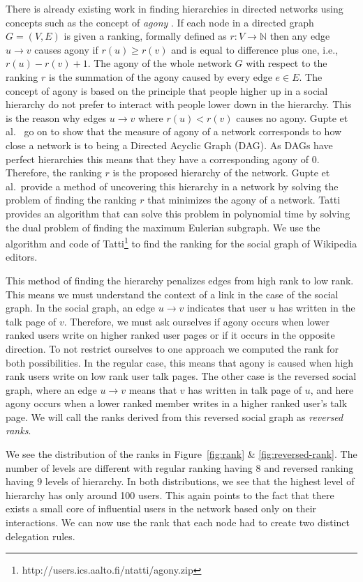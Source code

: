 There is already existing work in finding hierarchies in directed networks using concepts such as the concept of \textit{agony} \cite{Tatti2016,gupte2011finding}. If each node in a directed graph $G = (V,E)$ is given a ranking, formally defined as $r:V\rightarrow \mathbb{N}$ then any edge $u\rightarrow v$ causes agony if $r(u)\geq r(v)$ and is equal to difference plus one, i.e., $r(u)-r(v)+1$. The agony of the whole network $G$ with respect to the ranking $r$ is the summation of the agony caused by every edge $e \in E$. The concept of agony is based on the principle that people higher up in a social hierarchy do not prefer to interact with people lower down in the hierarchy. This is the reason why edges $u\rightarrow v$ where $r(u)<r(v)$ causes no agony. Gupte et al.\ \cite{gupte2011finding} go on to show that the measure of agony of a network corresponds to how close a network is to being a Directed Acyclic Graph (DAG). As DAGs have perfect hierarchies this means that they have a corresponding agony of $0$. Therefore, the ranking $r$ is the proposed hierarchy of the network. Gupte et al.\ provide a method of uncovering this hierarchy in a network by solving the problem of finding the ranking $r$ that minimizes the agony of a network. Tatti \cite{Tatti2016} provides an algorithm that can solve this problem in polynomial time by solving the dual problem of finding the maximum Eulerian subgraph. We use the algorithm and code of Tatti\footnote{http://users.ics.aalto.fi/ntatti/agony.zip} to find the ranking for the social graph of Wikipedia editors. 

This method of finding the hierarchy penalizes edges from high rank to low rank. This means we must understand the context of a link in the case of the social graph. In the social graph, an edge $u \rightarrow v$ indicates that user $u$ has written in the talk page of $v$. Therefore, we must ask ourselves if agony occurs when lower ranked users write on higher ranked user pages or if it occurs in the opposite direction. To not restrict ourselves to one approach we computed the rank for both possibilities. In the regular case, this means that agony is caused when high rank users write on low rank user talk pages. The other case is the reversed social graph, where an edge $u \rightarrow v$ means that $v$ has written in talk page of $u$, and here agony occurs when a lower ranked member writes in a higher ranked user's talk page. We will call the ranks derived from this reversed social graph as \textit{reversed ranks}. 

We see the distribution of the ranks in Figure~\ref{fig:rank} \& \ref{fig:reversed-rank}. The number of levels are different with regular ranking having $8$ and reversed ranking having $9$ levels of hierarchy. In both distributions, we see that the highest level of hierarchy has only around 100 users. This again points to the fact that there exists a small core of influential users in the network based only on their interactions. We can now use the rank that each node had to create two distinct delegation rules.

